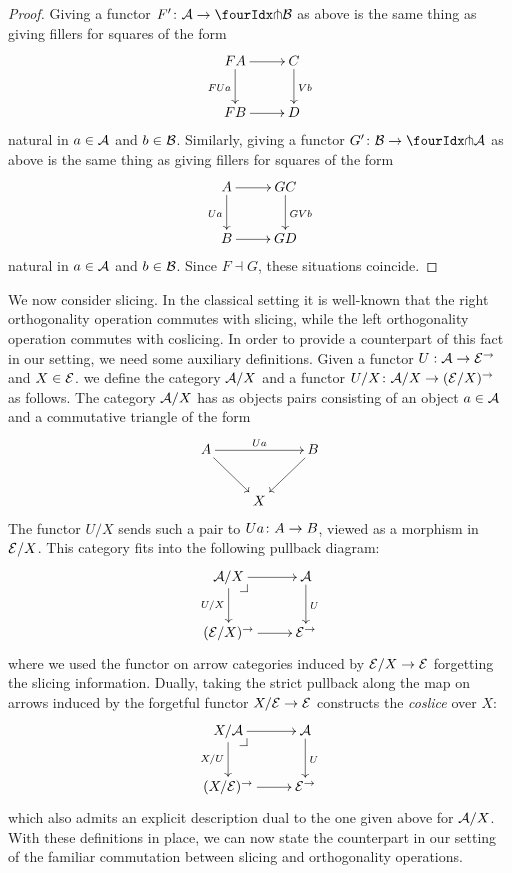 \documentclass[reqno,10pt,a4paper,oneside]{amsart}
\begin{document}
\begin{proof} Giving a functor $F' \co \cal{A} \to \liftl{\cal{B}}$ as above is the same thing as giving fillers for squares of the form
\[
\xymatrix{
FA \ar[d]_{FUa} \ar[r] & C \ar[d]^{Vb} \\
FB \ar[r] & D }
\]
natural in $a  \in \cal{A}$ and $b \in \cal{B}$. Similarly, giving a functor $G' \co \cal{B} \to \liftl{\cal{A}}$ as above is the same thing as giving fillers for squares 
of the form
\[
\xymatrix{
A \ar[d]_{Ua} \ar[r] & GC \ar[d]^{GVb} \\
B \ar[r] & GD }
\]
 natural in $a \in \cal{A}$ and $b \in \cal{B}$. Since $F \dashv G$, these situations coincide.
\end{proof}

\medskip


We now consider slicing. In the classical setting it is well-known that the right orthogonality operation commutes with slicing, while the left orthogonality operation commutes with coslicing.  In order to provide a counterpart of this fact in our setting, we need some auxiliary definitions. Given a functor $U : \cal{A} \to \catE^{\to}$ and $X \in \catE$.  we define the category $\cal{A}/X$
and a functor $U/X \co \cal{A}/X \to (\cal{E}/X)^\to$ as follows. The category $\cal{A}/X$ has as objects pairs consisting of an object $a \in \cal{A}$ and a commutative triangle of the form
\[
\xymatrix{
A \ar[dr] \ar[rr]^{Ua} & & B  \ar[dl] \\
 & X }
 \]
The functor $U/X$ sends such a pair to $Ua \co A \to B$, viewed as a morphism in $\cal{E}/X$. This category fits into the
following pullback diagram:
\[
\xymatrix{
  \cal{A}/X
  \ar[r]
  \ar[d]_{U/X}
  \pullback{dr}
&
  \cal{A}
  \ar[d]^{U}
\\
  (\catE/X)^{\to}
  \ar[r]
&
  \catE^{\to}
}
\]
where we used the functor on arrow categories induced by $\catE/X \to \catE$ forgetting the slicing information.  Dually, taking the strict pullback along the map on arrows induced by the forgetful functor $X/\cal{E} \to \catE$ constructs the \emph{coslice} over $X$:
\[
\xymatrix{
  X/\cal{A}
  \ar[r]
  \ar[d]_{X/U}
  \pullback{dr}
&
  \cal{A}
  \ar[d]^{U}
\\
  (X/\catE)^{\to}
  \ar[r]
&
  \catE^{\to}
}
\]
which also admits an explicit description dual to the one given above for $\cal{A}/X$. With these definitions in place, we can now state the counterpart in our setting of the familiar commutation between slicing and orthogonality operations. 
\end{document}
